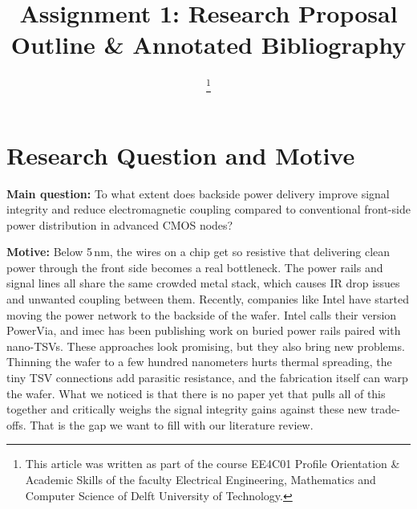 \documentclass[conference,a4paper]{IEEEtran}
\begin{document}
\title{Assignment 1: Research Proposal\\Outline \& Annotated Bibliography}

\author{
\and
{}
\thanks{This article was written as part of the course EE4C01 Profile Orientation \& Academic Skills of the faculty Electrical Engineering, Mathematics and Computer Science of Delft University of Technology.}
}

\maketitle

\section{Research Question and Motive}

\textbf{Main question:} To what extent does backside power delivery improve signal integrity and reduce electromagnetic coupling compared to conventional front-side power distribution in advanced CMOS nodes?

\medskip

\textbf{Motive:} Below 5\,nm, the wires on a chip get so resistive that delivering clean power through the front side becomes a real bottleneck. The power rails and signal lines all share the same crowded metal stack, which causes IR drop issues and unwanted coupling between them. Recently, companies like Intel have started moving the power network to the backside of the wafer. Intel calls their version PowerVia, and imec has been publishing work on buried power rails paired with nano-TSVs. These approaches look promising, but they also bring new problems. Thinning the wafer to a few hundred nanometers hurts thermal spreading, the tiny TSV connections add parasitic resistance, and the fabrication itself can warp the wafer. What we noticed is that there is no paper yet that pulls all of this together and critically weighs the signal integrity gains against these new trade-offs. That is the gap we want to fill with our literature review.
\end{document}
